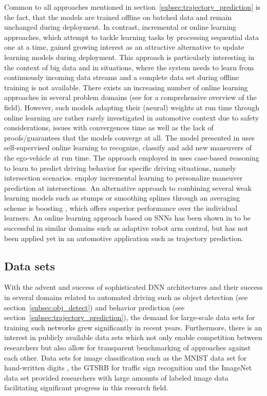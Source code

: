 Common to all approaches mentioned in section~\ref{subsec:trajectory_prediction} is the fact, that the models are trained offline on batched data and remain unchanged during deployment.
In contrast, incremental or online learning approaches, which attempt to tackle learning tasks by processing sequential data one at a time, gained growing interest as an attractive alternative to update learning models during deployment.
This approach is particularly interesting in the context of big data and in situations, where the system needs to learn from continuously incoming data streams and a complete data set during offline training is not available.
There exists an increasing number of online learning approaches in several problem domains (see \textcites{Losing2018}{Gomes2017}{Hoi2018} for a comprehensive overview of the field).
However, such models adapting their (neural) weights at run time through online learning are rather rarely investigated in automotive context due to safety considerations, issues with convergences time as well as the lack of proofs/guarantees that the models converge at all.
The model presented in \textcite{Maye2011} uses self-supervised online learning to recognize, classify and add new maneuvers of the ego-vehicle at run time.
The approach employed in \textcite{Graf2014} uses case-based reasoning to learn to predict driving behavior for specific driving situations, namely intersection scenarios.
\textcite{Losing2017} employ incremental learning to personalize maneuver prediction at intersections.
An alternative approach to combining several weak learning models such as stumps or smoothing splines through an averaging scheme is boosting \parencite{Taieb2014}, which offers superior performance over the individual learners.
An online learning approach based on \acp{SNN} has been shown in \textcite{DeWolf2016} to be successful in similar domains such as adaptive robot arm control, but has not been applied yet in an automotive application such as trajectory prediction.

\subsection{Data sets}%
\label{subsec:data_sets}

With the advent and success of sophisticated \ac{DNN} architectures and their success in several domains related to automated driving such as object detection (see section~\ref{subsec:obj_detect}) and behavior prediction (see section~\ref{subsec:trajectory_prediction}), the demand for large-scale data sets for training such networks grew significantly in recent years.
Furthermore, there is an interest in publicly available data sets which not only enable competition between researchers but also allow for transparent benchmarking of approaches against each other.
Data sets for image classification such as the \ac{MNIST} data set for hand-written digits \parencite{LeCun1998} , the \ac{GTSRB} for traffic sign recognition \parencite{Stallkamp2012} and the ImageNet data set \parencite{Deng2009} provided researchers with large amounts of labeled image data facilitating significant progress in this research field.

